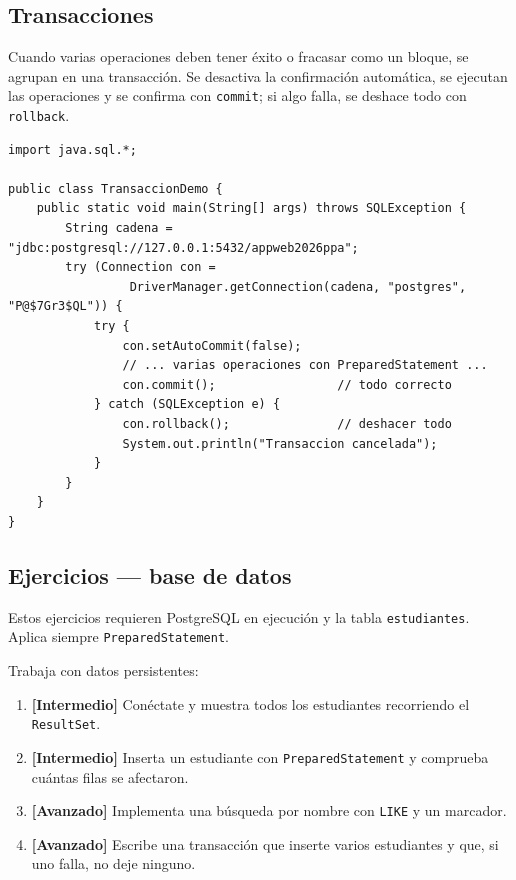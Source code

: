 \documentclass[11pt]{article}
\begin{document}
\subsection{Transacciones}
Cuando varias operaciones deben tener éxito o fracasar como un bloque, se agrupan en una transacción. Se desactiva la confirmación automática, se ejecutan las operaciones y se confirma con \texttt{commit}; si algo falla, se deshace todo con \texttt{rollback}.

\begin{cajacodigo}
\begin{lstlisting}[style=java]
import java.sql.*;

public class TransaccionDemo {
    public static void main(String[] args) throws SQLException {
        String cadena = "jdbc:postgresql://127.0.0.1:5432/appweb2026ppa";
        try (Connection con =
                 DriverManager.getConnection(cadena, "postgres", "P@$7Gr3$QL")) {
            try {
                con.setAutoCommit(false);
                // ... varias operaciones con PreparedStatement ...
                con.commit();                 // todo correcto
            } catch (SQLException e) {
                con.rollback();               // deshacer todo
                System.out.println("Transaccion cancelada");
            }
        }
    }
}
\end{lstlisting}
\end{cajacodigo}
\vspace{2pt}
\subsection{Ejercicios — base de datos}
Estos ejercicios requieren PostgreSQL en ejecución y la tabla \texttt{estudiantes}. Aplica siempre \texttt{Prepared\allowbreak{}Statement}.

Trabaja con datos persistentes:

\begin{enumerate}[leftmargin=1.7em,itemsep=3pt,topsep=2pt]
\item \textbf{[Intermedio]} Conéctate y muestra todos los estudiantes recorriendo el \texttt{Result\allowbreak{}Set}.
\item \textbf{[Intermedio]} Inserta un estudiante con \texttt{Prepared\allowbreak{}Statement} y comprueba cuántas filas se afectaron.
\item \textbf{[Avanzado]} Implementa una búsqueda por nombre con \texttt{LIKE} y un marcador.
\item \textbf{[Avanzado]} Escribe una transacción que inserte varios estudiantes y que, si uno falla, no deje ninguno.
\end{enumerate}
\end{document}
